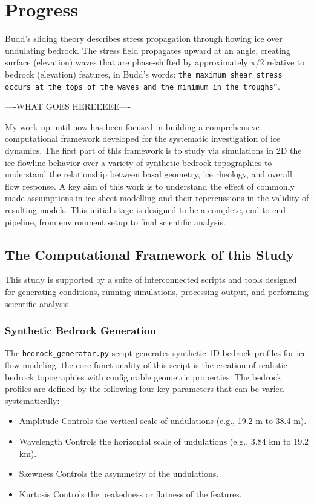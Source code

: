 \chapter{Progress}

Budd's sliding theory describes stress propagation through flowing ice over undulating bedrock. The stress field propagates upward at an angle, creating surface (elevation) waves that are phase-shifted by approximately $\pi/2$ relative to bedrock (elevation) features, in Budd's words: \texttt{\texttt{the maximum shear stress occurs at the tops of the waves and the minimum in the troughs''\cite{Budd_1970}}}. 

----WHAT GOES HEREEEEE---- 

My work up until now has been focused in building a comprehensive computational framework developed for the systematic investigation of ice dynamics. The first part of this framework is to study via simulations in 2D the ice flowline behavior over a variety of synthetic bedrock topographies to understand the relationship between basal geometry, ice rheology, and overall flow response. A key aim of this work is to understand the effect of commonly made assumptions in ice sheet modelling and their repercussions in the validity of resulting models. This initial stage is designed to be a complete, end-to-end pipeline, from environment setup to final scientific analysis. 

\section{The Computational Framework of this Study}

This study is supported by a suite of interconnected scripts and tools designed for generating conditions, running simulations, processing output, and performing scientific analysis.

\subsection{Synthetic Bedrock Generation}

The \texttt{bedrock\_generator.py} script generates synthetic 1D bedrock profiles for ice flow modeling. the core functionality of this script is the creation of realistic bedrock topographies with configurable geometric properties. The bedrock profiles are defined by the following four key parameters that can be varied systematically:
\begin{itemize}
\item{Amplitude} Controls the vertical scale of undulations (e.g., 19.2 m to 38.4 m).
\item{Wavelength} Controls the horizontal scale of undulations (e.g., 3.84 km to 19.2 km).
\item{Skewness} Controls the asymmetry of the undulations.
\item{Kurtosis} Controls the peakedness or flatness of the features.
\end{itemize}


